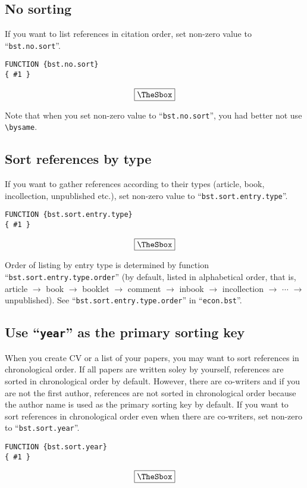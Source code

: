 \documentclass[10pt]{article}
\newenvironment{Frame}%
{\setlength{\fboxsep}{15pt}
\setlength{\mylength}{\linewidth}%
\addtolength{\mylength}{-2\fboxsep}%
\addtolength{\mylength}{-2\fboxrule}%
\Sbox
\minipage{\mylength}%
\setlength{\abovedisplayskip}{0pt}%
\setlength{\belowdisplayskip}{0pt}%
}%
{\endminipage\endSbox
\[\fbox{\TheSbox}\]}
\begin{document}
\subsection{No sorting}

If you want to list references in citation order, set non-zero value to
``\texttt{bst.no.sort}''.
\begin{Frame}
\begin{verbatim}
FUNCTION {bst.no.sort}
{ #1 }
\end{verbatim}
\end{Frame}

Note that when you set non-zero value to ``\texttt{bst.no.sort}'', you had better not
use \verb|\bysame|.

\subsection{Sort references by type}

If you want to gather references according to their types (article,
book, incollection, unpublished etc.), set non-zero value to
``\texttt{bst.sort.entry.type}''.
\begin{Frame}
\begin{verbatim}
FUNCTION {bst.sort.entry.type}
{ #1 }
\end{verbatim}
\end{Frame}

Order of listing by entry type is determined by function
``\texttt{bst.sort.entry.type.order}'' (by default, listed in alphabetical
order, that is, article $\rightarrow$ book $\rightarrow$ booklet
$\rightarrow$ comment $\rightarrow$ inbook $\rightarrow$ incollection
$\rightarrow$ $\cdots$ $\rightarrow$ unpublished).  See
``\texttt{bst.sort.entry.type.order}'' in ``\texttt{econ.bst}''.

\subsection{Use ``\texttt{year}''  as the primary sorting key}

When you create CV or a list of your papers, you may want to sort
references in chronological order.  If all papers are written soley by
yourself, references are sorted in chronological order by default.
However, there are co-writers and if you are not the first author,
references are not sorted in chronological order because the author name
is used as the primary sorting key by default.
If you want to sort references in chronological order even when
there are co-writers, set non-zero to ``\texttt{bst.sort.year}''.
\begin{Frame}
\begin{verbatim}
FUNCTION {bst.sort.year}
{ #1 }
\end{verbatim}
\end{Frame}
\end{document}
